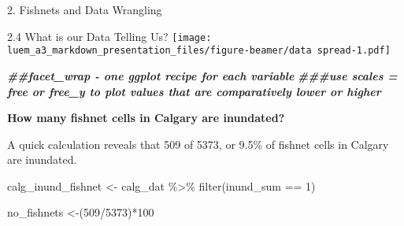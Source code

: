 \documentclass[
  ignorenonframetext,
]{beamer}
\newenvironment{Shaded}{\begin{snugshade}}{\end{snugshade}}
\newcommand{\DecValTok}[1]{\textcolor[rgb]{0.00,0.00,0.81}{#1}}
\newcommand{\DocumentationTok}[1]{\textcolor[rgb]{0.56,0.35,0.01}{\textbf{\textit{#1}}}}
\newcommand{\FunctionTok}[1]{\textcolor[rgb]{0.00,0.00,0.00}{#1}}
\newcommand{\NormalTok}[1]{#1}
\newcommand{\OtherTok}[1]{\textcolor[rgb]{0.56,0.35,0.01}{#1}}
\newcommand{\SpecialCharTok}[1]{\textcolor[rgb]{0.00,0.00,0.00}{#1}}
\begin{document}
\begin{frame}[fragile]{2. Fishnets and Data Wrangling}
\begin{block}{2.4 What is our Data Telling Us?}
\texttt{[image: luem\_a3\_markdown\_presentation\_files/figure-beamer/data spread-1.pdf]}

\begin{Shaded}
\begin{Highlighting}[]
\DocumentationTok{\#\#facet\_wrap {-} one ggplot recipe for each variable}
\DocumentationTok{\#\#\#use scales = free or free\_y to plot values that are comparatively lower or higher}
\end{Highlighting}
\end{Shaded}

\textbf{How many fishnet cells in Calgary are inundated?}

A quick calculation reveals that 509 of 5373, or 9.5\% of fishnet cells
in Calgary are inundated.

\begin{Shaded}
\begin{Highlighting}[]
\NormalTok{calg\_inund\_fishnet }\OtherTok{\textless{}{-}}\NormalTok{ calg\_dat }\SpecialCharTok{\%\textgreater{}\%} 
  \FunctionTok{filter}\NormalTok{(inund\_sum }\SpecialCharTok{==} \DecValTok{1}\NormalTok{)}

\NormalTok{no\_fishnets }\OtherTok{\textless{}{-}}\NormalTok{(}\DecValTok{509}\SpecialCharTok{/}\DecValTok{5373}\NormalTok{)}\SpecialCharTok{*}\DecValTok{100}
\end{Highlighting}
\end{Shaded}
\end{block}
\end{frame}
\end{document}
